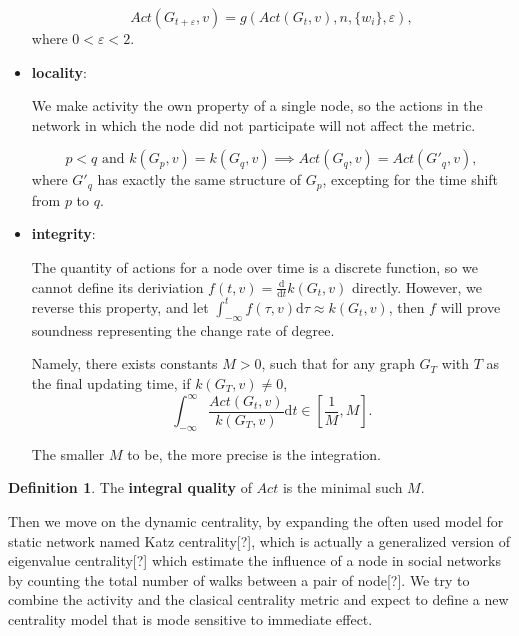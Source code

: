 \documentclass[12pt,abstract=true]{scrartcl}
\numberwithin{equation}{section}
\theoremstyle{definition}   \newtheorem{definition}{Definition}[section]
\theoremstyle{plain}        \newtheorem{theorem}{Theorem}[section]
\theoremstyle{plain}        \newtheorem{observation}{Observation}[section]
\theoremstyle{plain}        \newtheorem{fact}{Fact}[section]
\theoremstyle{plain}        \newtheorem{claim}{Claim}[section]
\theoremstyle{plain}        \newtheorem{lemma}[theorem]{Lemma}
\theoremstyle{plain}        \newtheorem{corollary}[theorem]{Corollary}
\theoremstyle{remark}       \newtheorem{example}{Example}[section]
\theoremstyle{remark}       \newtheorem{remark}{Remark}[section]
\begin{document}
\begin{itemize}
\begin{equation}
\mathit{Act}(G_{t+\varepsilon},v)=g(\mathit{Act}(G_t,v),n,\{w_i\},\varepsilon),
\label{eq-sym}
\end{equation}
where $0<\varepsilon<2$.

\item \textbf{locality}:

We make activity the own property of a single node, so the actions in the
network in which the node did not participate will not affect the metric.

\begin{equation}
p<q\text{ and }k(G_p,v)=k(G_q,v)\implies \mathit{Act}(G_q,v)=\mathit{Act}(G'_q,v),\label{eq-loc}
\end{equation}
where $G'_q$ has exactly the same structure of $G_p$, excepting for the time
shift from $p$ to $q$.

\item \textbf{integrity}:

The quantity of actions for a node over time is a discrete function, so we
cannot define its deriviation $f(t,v)=\frac{\mathrm{d}}{\mathrm{d}t}k(G_t,v)$
directly. However, we reverse this property, and let $\int_{-\infty}^t
f(\tau,v)\mathrm{d}\tau\approx k(G_t,v)$, then $f$ will prove soundness
representing the change rate of degree.

Namely, there exists constants $M>0$, such that for any
graph $G_T$ with $T$ as the final updating time, if $k(G_T,v)\neq 0$,
\begin{equation}
\int_{-\infty}^{\infty} \frac{\mathit{Act}(G_t,v)}{k(G_T,v)}\mathrm{d}t\in\left[\frac{1}{M},M\right].
\label{eq-int}
\end{equation}

The smaller $M$ to be, the more precise is the integration.

\end{itemize}

\begin{definition}
The \textbf{integral quality} of $\mathit{Act}$ is the minimal such $M$.
\end{definition}


Then we move on the dynamic centrality, by expanding the often used model
for static network named Katz centrality[?], which is actually a generalized
version of eigenvalue centrality[?] which estimate the influence of a node in
social networks by counting the total number of walks between a pair of
node[?]. We try to combine the activity and the clasical centrality metric and
expect to define a new centrality model that is mode sensitive to immediate
effect.
\end{document}
